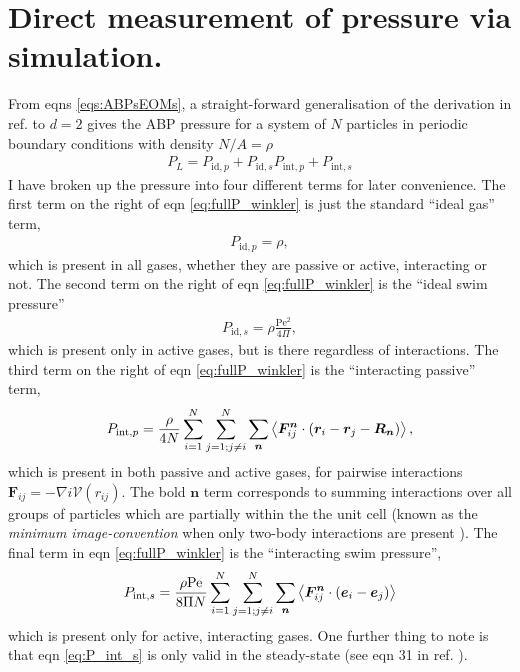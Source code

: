 \documentclass[twocolumn,amsmath,amssymb,aps]{revtex4-1}%
\begin{document}
\section{Direct measurement of pressure via simulation.}

From eqns \ref{eqs:ABPsEOMs}, a straight-forward generalisation of the
derivation in ref. \cite{C5SM01412C} to $d=2$ gives the ABP pressure
for a system of $N$ particles in periodic boundary conditions with
density $N/A=\rho$
\begin{align}\label{eq:fullP_winkler}
  P_L=
  P_{\mathrm{id},p} + P_{\mathrm{id},s}
  P_{\mathrm{int},p} + P_{\mathrm{int},s}
\end{align}
I have broken up the pressure into four different terms for later
convenience. The first term on the right of eqn \ref{eq:fullP_winkler} is just
the standard ``ideal gas'' term,
\begin{align}\label{eq:P_id_p}
  P_{\mathrm{id},p}
  = \rho,
\end{align}
which is present in all gases, whether they are passive or active,
interacting or not.
The second term on the right of eqn \ref{eq:fullP_winkler} is the
``ideal swim pressure''
\cite{C5SM01412C,PhysRevLett.113.028103}
\begin{align}\label{eq:P_id_s}
  P_{\mathrm{id},s}
  = \rho\frac{\mathrm{Pe}^2}{4\Pi},
\end{align}
which is present only in active gases, but is there regardless of
interactions.
The third term on the right of eqn \ref{eq:fullP_winkler} is the
``interacting passive'' term,
\begin{align}\label{eq:P_int_p}
  P_{\mathrm{int},p}
  =\frac{\rho}{4N}\sum_{i=1}^N\sum_{j=1;j\neq i}^N\sum_{\bm{n}}
  \Braket{\bm{F}_{ij}^{\bm{n}}\cdot(\bm{r}_i-\bm{r}_j-\bm{R}_{\bm{n}})},
\end{align}
which is present in both passive and active gases, for pairwise
interactions $\bm{F}_{ij}=-\nabla{i}\mathcal{V}(r_{ij})$. The
bold $\bm{n}$ term corresponds to summing interactions over
all groups of particles which are partially within the the
unit cell (known as the \textit{minimum image-convention}
when only two-body interactions are present
\cite{doi:10.1063/1.3245303}).
The final term in eqn \ref{eq:fullP_winkler} is the
``interacting swim pressure'',
\begin{align}\label{eq:P_int_s}
  P_{\mathrm{int},s}
  = \frac{\rho\mathrm{Pe}}{8\Pi N}
  \sum_{i=1}^N\sum_{j=1;j\neq i}^N\sum_{\bm{n}}
  \Braket{\bm{F}_{ij}^{\bm{n}}\cdot(\bm{e}_i-\bm{e}_j)}
\end{align}
which is present only for active, interacting gases. One further
thing to note is that eqn \ref{eq:P_int_s} is only valid in
the steady-state (see eqn 31 in ref. \cite{C5SM01412C}).
\end{document}
